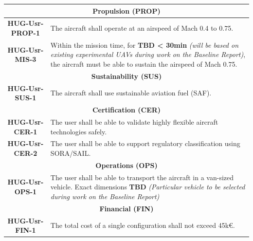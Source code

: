 \begin{table}[H]
\begin{tabular}{|c|p{13cm}|}
        \multicolumn{2}{|c|}{\textbf{Propulsion (PROP)}} \\
        \hline
        \textbf{HUG-Usr-PROP-1} & The aircraft shall operate at an airspeed of Mach 0.4 to 0.75.\\
        \hline
        \textbf{HUG-Usr-MIS-3} & Within the mission time, for \textbf{TBD < 30min} \textit{(will be based on existing experimental UAVs during work on the Baseline Report)}, the aircraft must be able to sustain the airspeed of Mach 0.75. \\
        \hline

        \multicolumn{2}{|c|}{\textbf{Sustainability (SUS)}} \\
        \hline
        \textbf{HUG-Usr-SUS-1} & The aircraft shall use sustainable aviation fuel (SAF).\\
        \hline

        \multicolumn{2}{|c|}{\textbf{Certification (CER)}} \\
        \hline
        \textbf{HUG-Usr-CER-1} & The user shall be able to validate highly flexible aircraft technologies safely.\\
        \hline
        \textbf{HUG-Usr-CER-2} & The user shall be able to support regulatory classification using SORA/SAIL.\\
        \hline

        \multicolumn{2}{|c|}{\textbf{Operations (OPS)}} \\
        \hline
        \textbf{HUG-Usr-OPS-1} & The user shall be able to transport the aircraft in a van-sized vehicle. Exact dimensions \textbf{TBD} \textit{(Particular vehicle to be selected during work on the Baseline Report)} \\
        \hline

        \multicolumn{2}{|c|}{\textbf{Financial (FIN)}} \\
        \hline
        \textbf{HUG-Usr-FIN-1} & The total cost of a single configuration shall not exceed 45k€. \\
        \hline

    \end{tabular}
    \label{tab:user_requirements}
\end{table}